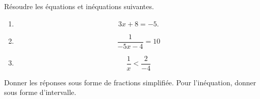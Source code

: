 
\begin{exercice}\label{exosmath-0346}

    Résoudre les équations et inéquations suivantes.
    \begin{enumerate}
        \item
            \begin{equation}
                3x+8=-5.
            \end{equation}
        \item
            \begin{equation}
                \frac{ 1 }{ -5x-4 }=10
            \end{equation}
        \item
            \begin{equation}
                \frac{ 1 }{ x }<\frac{ 2 }{ -4 }
            \end{equation}
    \end{enumerate}
    Donner les réponses sous forme de fractions simplifiée. Pour l'inéquation, donner sous forme d'intervalle.

\end{exercice}
